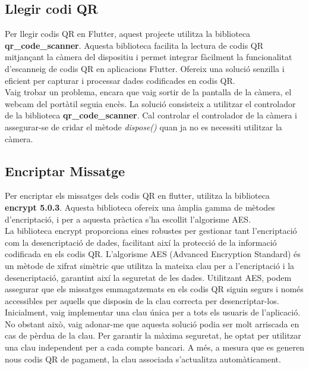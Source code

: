 \documentclass[a4paper,12pt,twoside]{ThesisStyle}
\begin{document}
\clearpage
\subsection{Llegir codi QR}
\label{subsec: Llegir codi QR}

Per llegir codis QR en Flutter, aquest projecte utilitza la biblioteca \textbf{qr\_code\_scanner}. Aquesta biblioteca facilita la lectura de codis QR mitjançant la càmera del dispositiu i permet integrar fàcilment la funcionalitat d'escanneig de codis QR en aplicacions Flutter. Ofereix una solució senzilla i eficient per capturar i processar dades codificades en codis QR.\\

Vaig trobar un problema, encara que vaig sortir de la pantalla de la càmera, el webcam del portàtil seguia encès. La solució consisteix a utilitzar el controlador de la biblioteca \textbf{qr\_code\_scanner}. Cal controlar el controlador de la càmera i assegurar-se de cridar el mètode \textit{dispose()} quan ja no es necessiti utilitzar la càmera.


\subsection{Encriptar Missatge}
\label{subsec: Encriptar Missatge}

Per encriptar els missatges dels codis QR en flutter, utilitza la biblioteca \textbf{encrypt 5.0.3}. Aquesta biblioteca ofereix una àmplia gamma de mètodes d'encriptació, i per a aquesta pràctica s'ha escollit l'algorisme AES.\\

La biblioteca encrypt proporciona eines robustes per gestionar tant l'encriptació com la desencriptació de dades, facilitant així la protecció de la informació codificada en els codis QR. L'algorisme AES (Advanced Encryption Standard) és un mètode de xifrat simètric que utilitza la mateixa clau per a l'encriptació i la desencriptació, garantint així la seguretat de les dades. Utilitzant AES, podem assegurar que els missatges emmagatzemats en els codis QR siguin segurs i només accessibles per aquells que disposin de la clau correcta per desencriptar-los.\\

Inicialment, vaig implementar una clau única per a tots els usuaris de l'aplicació. No obstant això, vaig adonar-me que aquesta solució podia ser molt arriscada en cas de pèrdua de la clau. Per garantir la màxima seguretat, he optat per utilitzar una clau independent per a cada compte bancari. A més, a mesura que es generen nous codis QR de pagament, la clau associada s'actualitza automàticament.
\end{document}
